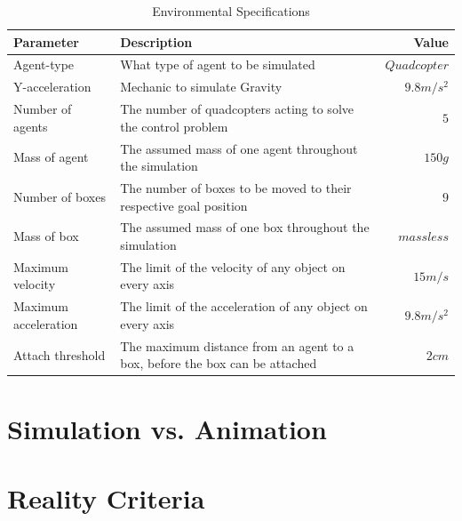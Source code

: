 \begin{table}[]
\centering
\begin{tabularx}{1\textwidth}{l@{}Xr}
\toprule
\textbf{Parameter}   & \textbf{Description}                                                        & \textbf{Value} \\ \midrule
Agent-type       	 & What type of agent to be simulated                                          & ${Quadcopter}$     \\
Y-acceleration       & Mechanic to simulate Gravity                                                & ${9.8m/s^2}$  \\
Number of agents     & The number of quadcopters acting to solve the control problem               & ${5}$          \\
Mass of agent        & The assumed mass of one agent throughout the simulation                     & ${150g}$      \\
Number of boxes      & The number of boxes to be moved to their respective goal position           & ${9}$              \\
Mass of box          & The assumed mass of one box throughout the simulation                       & ${massless}$       \\
Maximum velocity     & The limit of the velocity of any object on every axis                       & ${15m/s}$         \\
Maximum acceleration & The limit of the acceleration of any object on every axis                   & ${9.8m/s^2}$       \\
Attach threshold     & The maximum distance from an agent to a box, before the box can be attached & ${2cm}$           \\ \bottomrule
\end{tabularx}
\caption{Environmental Specifications}
\label{sim:env_specs}
\end{table}
\section{Simulation vs. Animation}
\label{sec:simulation_animation}


\section{Reality Criteria}
\label{sec:reality}

